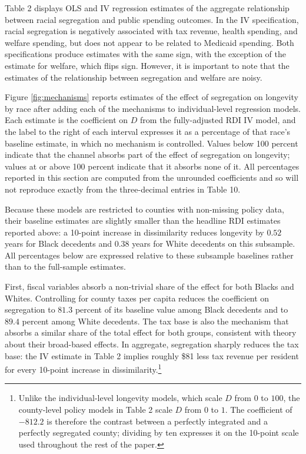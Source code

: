 \documentclass[11pt]{article}
\begin{document}


Table 2 displays OLS and IV regression estimates of the aggregate relationship between racial segregation and public spending outcomes. In the IV specification, racial segregation is negatively associated with tax revenue, health spending, and welfare spending, but does not appear to be related to Medicaid spending. Both specifications produce estimates with the same sign, with the exception of the estimate for welfare, which flips sign. However, it is important to note that the estimates of the relationship between segregation and welfare are noisy.

Figure \ref{fig:mechanisms} reports estimates of the effect of segregation on longevity by race after adding each of the mechanisms to individual-level regression models. Each estimate is the coefficient on $D$ from the fully-adjusted RDI IV model, and the label to the right of each interval expresses it as a percentage of that race's baseline estimate, in which no mechanism is controlled. Values below 100 percent indicate that the channel absorbs part of the effect of segregation on longevity; values at or above 100 percent indicate that it absorbs none of it. All percentages reported in this section are computed from the unrounded coefficients and so will not reproduce exactly from the three-decimal entries in Table 10.

Because these models are restricted to counties with non-missing policy data, their baseline estimates are slightly smaller than the headline RDI estimates reported above: a 10-point increase in dissimilarity reduces longevity by $0.52$ years for Black decedents and $0.38$ years for White decedents on this subsample. All percentages below are expressed relative to these subsample baselines rather than to the full-sample estimates.

First, fiscal variables absorb a non-trivial share of the effect for both Blacks and Whites. Controlling for county taxes per capita reduces the coefficient on segregation to $81.3$ percent of its baseline value among Black decedents and to $89.4$ percent among White decedents. The tax base is also the mechanism that absorbs a similar share of the total effect for both groups, consistent with theory about their broad-based effects. In aggregate, segregation sharply reduces the tax base: the IV estimate in Table 2 implies roughly \$81 less tax revenue per resident for every 10-point increase in dissimilarity.\footnote{Unlike the individual-level longevity models, which scale $D$ from $0$ to $100$, the county-level policy models in Table 2 scale $D$ from $0$ to $1$. The coefficient of $-812.2$ is therefore the contrast between a perfectly integrated and a perfectly segregated county; dividing by ten expresses it on the 10-point scale used throughout the rest of the paper.}
\end{document}
